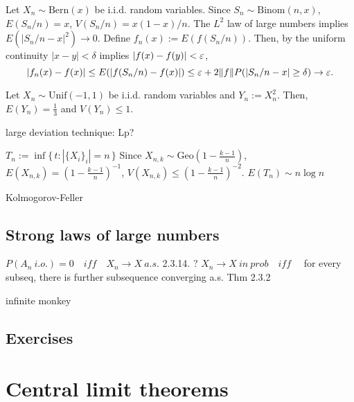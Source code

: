 \documentclass{../note}
\def\Unif{\mathrm{Unif}}
\def\Bern{\mathrm{Bern}}
\def\Binom{\mathrm{Binom}}
\def\Geo{\mathrm{Geo}}
\begin{document}
\begin{prb}
Let $X_n\sim\Bern(x)$ be i.i.d. random variables.
Since $S_n\sim\Binom(n,x)$, $E(S_n/n)=x$, $V(S_n/n)=x(1-x)/n$.
The $L^2$ law of large numbers implies $E(|S_n/n-x|^2)\to0$.
Define $f_n(x):=E(f(S_n/n))$.
Then, by the uniform continuity $|x-y|<\delta$ implies $|f(x)-f(y)|<\varepsilon$,
\[|f_n(x)-f(x)|\le E(|f(S_n/n)-f(x)|)\le\varepsilon+2\|f\|P(|S_n/n-x|\ge\delta)\to\varepsilon.\]
\end{prb}



\begin{prb}
Let $X_n\sim\Unif(-1,1)$ be i.i.d. random variables and $Y_n:=X_n^2$.
Then, $E(Y_n)=\frac13$ and $V(Y_n)\le1$.

\end{prb}

large deviation technique: Lp?

\begin{prb}
$T_n:=\inf\{\,t:|\{X_i\}_i|=n\,\}$
Since $X_{n,k}\sim\Geo(1-\frac{k-1}n)$, $E(X_{n,k})=(1-\frac{k-1}n)^{-1}$, $V(X_{n,k})\le(1-\frac{k-1}n)^{-2}$.
$E(T_n)\sim n\log n$
\end{prb}
\begin{prb}
\end{prb}
\begin{prb}
\end{prb}

Kolmogorov-Feller

\section{Strong laws of large numbers}

$P(A_n\ i.o.)=0\quad iff \quad X_n\to X\ a.s.$ 2.3.14. ?
$X_n\to X\ in\ prob\quad iff \quad$ for every subseq, there is further subsequence converging a.s. Thm 2.3.2

infinite monkey






\section*{Exercises}




\chapter{Central limit theorems}
\end{document}
